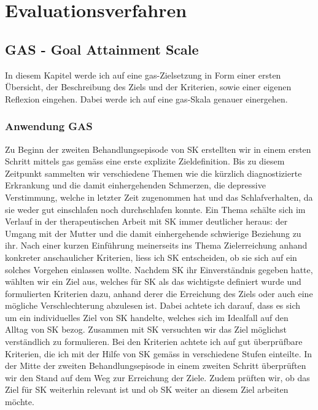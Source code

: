 \section{Evaluationsverfahren}\label{sec:Evaluationsverfahren}

\subsection{GAS - Goal Attainment Scale}
In diesem Kapitel werde ich auf eine \ac{gas}-Zielsetzung in Form einer ersten Übersicht, der Beschreibung des Ziels und der Kriterien, sowie einer eigenen Reflexion eingehen. Dabei werde ich auf eine \ac{gas}-Skala genauer einergehen. 

\subsubsection{Anwendung GAS}
Zu Beginn der zweiten Behandlungsepisode von SK erstellten wir in einem ersten Schritt mittels \ac{gas} gemäss  eine erste explizite Zieldefinition. Bis zu diesem Zeitpunkt sammelten wir verschiedene Themen wie die kürzlich diagnostizierte Erkrankung und die damit einhergehenden Schmerzen, die depressive Verstimmung, welche in letzter Zeit zugenommen hat und das Schlafverhalten, da sie weder gut einschlafen noch durchschlafen konnte. Ein Thema schälte sich im Verlauf in der therapeutischen Arbeit mit SK immer deutlicher heraus: der Umgang mit der Mutter und die damit einhergehende schwierige Beziehung zu ihr. Nach einer kurzen Einführung meinerseits ins Thema Zielerreichung anhand konkreter anschaulicher Kriterien, liess ich SK entscheiden, ob sie sich auf ein solches Vorgehen einlassen wollte. Nachdem SK ihr Einverständnis gegeben hatte, wählten wir ein Ziel aus, welches für SK als das wichtigste definiert wurde und formulierten Kriterien dazu, anhand derer die Erreichung des Ziels oder auch eine mögliche Verschlechterung abzulesen ist. Dabei achtete ich darauf, dass es sich um ein individuelles Ziel von SK handelte, welches sich im Idealfall auf den Alltag von SK bezog. Zusammen mit SK versuchten wir das Ziel möglichst verständlich zu formulieren. Bei den Kriterien achtete ich auf gut überprüfbare Kriterien, die ich mit der Hilfe von SK gemäss  in verschiedene Stufen einteilte. In der Mitte der zweiten Behandlungsepisode in einem zweiten Schritt überprüften wir den Stand auf dem Weg zur Erreichung der Ziele. Zudem prüften wir, ob das Ziel für SK weiterhin relevant ist und ob SK weiter an diesem Ziel arbeiten möchte.

